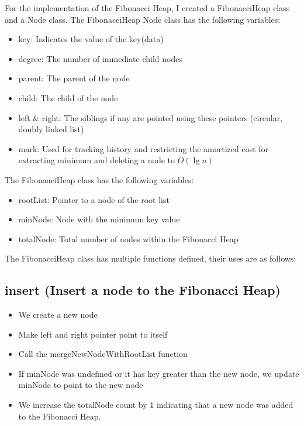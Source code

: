 For the implementation of the Fibonacci Heap, I created a FibonacciHeap class and a Node class.
The FibonacciHeap Node class has the following variables:
\begin{itemize}
	\item key: Indicates the value of the key(data)
	\item degree: The number of immediate child nodes
	\item parent: The parent of the node
	\item child: The child of the node
	\item left \& right: The siblings if any are pointed using these pointers (circular, doubly linked list)
	\item mark: Used for tracking history and restricting the amortized cost for extracting minimum and deleting a node to $O(\lg{n})$  
\end{itemize}
The FibonaaciHeap class has the following variables: 
\begin{itemize}
	\item rootList: Pointer to a node of the root list
	\item minNode: Node with the minimum key value
	\item totalNode: Total number of nodes within the Fibonacci Heap
\end{itemize}
The FibonacciHeap class has multiple functions defined, their uses are as follows:
\subsection{ insert (Insert a node to the Fibonacci Heap) }
\begin{itemize}
		\item We create a new node
		\item Make left and right pointer point to itself
		\item Call the mergeNewNodeWithRootList function
		\item If minNode was undefined or it has key greater than the new node, we update minNode to point to the new node
		\item We increase the totalNode count by 1 indicating that a new node was added to the Fibonacci Heap.
\end{itemize}

